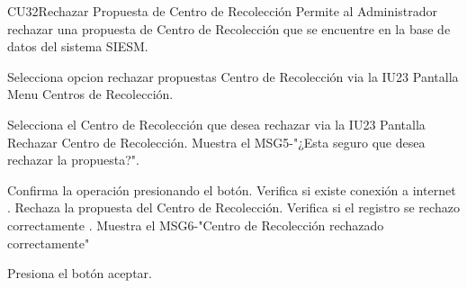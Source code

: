 \begin{UseCase}{CU32}{Rechazar Propuesta de Centro de Recolección}{
		Permite al Administrador rechazar una propuesta de Centro de Recolección que se encuentre en la base de datos del sistema SIESM.\\
}
	
\end{UseCase}



\begin{UCtrayectoria}
	\item\UCactor Selecciona opcion rechazar propuestas Centro de Recolección via la IU23 Pantalla Menu Centros de Recolección.
	\item\UCactor Selecciona el Centro de Recolección que desea rechazar via la IU23 Pantalla Rechazar Centro de Recolección.
	\UCpaso Muestra el MSG5-"¿Esta seguro que desea rechazar la propuesta?".
	\item\UCactor Confirma la operación presionando el botón.
	\UCpaso Verifica si existe conexión a internet .
	\UCpaso Rechaza la propuesta del Centro de Recolección.
	\UCpaso Verifica si el registro se rechazo correctamente .
	\UCpaso Muestra el MSG6-"Centro de Recolección rechazado correctamente"
	\item\UCactor Presiona el botón aceptar.
\end{UCtrayectoria}


